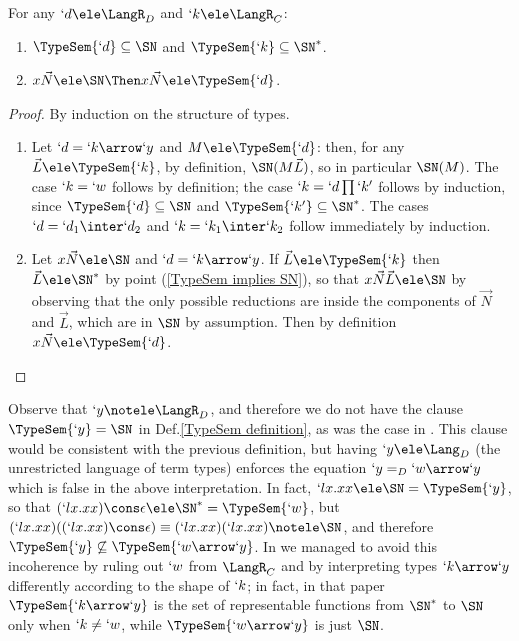 \documentclass{CSML}
\newcommand{\vect}[1]{\vec{#1}}
\begin{document}
 \begin{lem} \label{TypeSem and SN lemma}
For any $ `d \ele\LangR_D$ and $`k \ele\LangR_C$:
 \begin{enumerate}

 \item \label{TypeSem implies SN}
$\TypeSem{`d} \subseteq \SN $ and $\TypeSem{`k } \subseteq \SN^* $.

 \item \label{SN head implies TypeSem}
$x\vect{N} \ele \SN \Then x\vect{N} \ele \TypeSem{`d}$.

 \end{enumerate}
 \end {lem}

 \begin{proof}
By induction on the structure of types.

 \begin{enumerate}

 \item %
Let $`d = `k\arrow `y$ and $M \ele \TypeSem{`d}$: 
then, for any $\vect{L} \ele \TypeSem{`k}$, by definition, $\SN(M \vect{L})$, so in particular $\SN(M)$.
%
The case $`k=`w$ follows by definition; the case $`k = `d\prod `k'$ follows by induction, since $\TypeSem{`d} \subseteq \SN$ and $\TypeSem{`k' }\subseteq \SN^*$. 
The cases $`d = `d_1\inter`d_2$ and $`k = `k_1\inter`k_2$ follow immediately by induction.

 \item %
Let $x\vect{N} \ele \SN$ and $`d = `k\arrow `y$. 
If $\vect{L} \ele \TypeSem{`k }$ then $\vect{L} \ele \SN^*$ by point (\ref{TypeSem implies SN}), so that $x\vect{N}\vect{L} \ele \SN$ by observing that the only possible reductions are inside the components of $\vect{N}$ and $\vect{L}$, which are in $\SN$ by assumption.
Then by definition $ x\vect{N} \ele \TypeSem{`d}$.
 \qedhere
 \end{enumerate}
 \end{proof}

\noindent Observe that $`y\notele \LangR_D$, and therefore we do not have the clause $\TypeSem{`y} = \SN$ in Def.\skp\ref{TypeSem definition}, as was the case in \cite{BakBdL-ITRS12}. 
This clause would be consistent with the previous definition, but having $`y \ele \Lang_D$ (the unrestricted language of term types) enforces the equation $`y =_D `w\arrow `y$ which is false in the above interpretation.
In fact, $`l x.xx \ele \SN = \TypeSem{`y}$, so that $(`l x.xx)\cons \epsilon \ele \SN^* = \TypeSem{`w}$, but $(`l x.xx)((`l x.xx)\cons \epsilon) \equiv (`l x.xx)(`l x.xx) \notele \SN$, and therefore $\TypeSem{`y}\not\subseteq \TypeSem{`w\arrow `y}$. 
In \cite{BakBdL-ITRS12} we managed to avoid this incoherence by ruling out $`w$ from $\LangR_C$ and by interpreting types $`k\arrow `y$ differently according to the shape of $`k$; in fact, in that paper $\TypeSem{`k\arrow `y}$ is the set of representable functions from $\SN^*$ to $\SN$ only when $`k \neq`w$, while $\TypeSem{`w\arrow `y}$ is just $\SN$.
\end{document}
